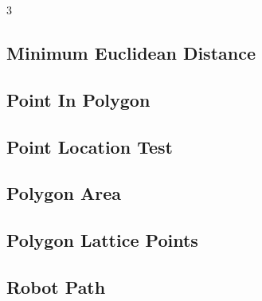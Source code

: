 \documentclass[8pt]{extarticle}
\begin{document}
\begin{multicols*}{3}
\subsection{Minimum Euclidean Distance}
\begin{caixaenunciado}

\end{caixaenunciado}
\vspace{0.3cm}


\subsection{Point In Polygon}
\begin{caixaenunciado}

\end{caixaenunciado}
\vspace{0.3cm}


\subsection{Point Location Test}
\begin{caixaenunciado}

\end{caixaenunciado}
\vspace{0.3cm}


\subsection{Polygon Area}
\begin{caixaenunciado}

\end{caixaenunciado}
\vspace{0.3cm}


\subsection{Polygon Lattice Points}
\begin{caixaenunciado}

\end{caixaenunciado}
\vspace{0.3cm}


\subsection{Robot Path}
\begin{caixaenunciado}

\end{caixaenunciado}
\vspace{0.3cm}

\end{multicols*}
\end{document}
